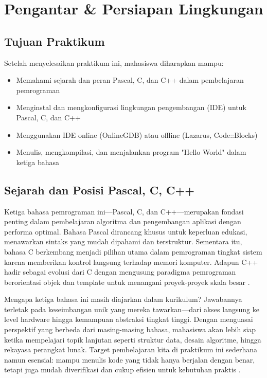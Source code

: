\documentclass[../main.tex]{subfiles}
\begin{document}
\chapter{Pengantar \& Persiapan Lingkungan}

\section*{Tujuan Praktikum}
Setelah menyelesaikan praktikum ini, mahasiswa diharapkan mampu:
\begin{itemize}
  \item Memahami sejarah dan peran Pascal, C, dan C++ dalam pembelajaran pemrograman
  \item Menginstal dan mengkonfigurasi lingkungan pengembangan (IDE) untuk Pascal, C, dan C++
  \item Menggunakan IDE online (OnlineGDB) atau offline (Lazarus, Code::Blocks)
  \item Menulis, mengkompilasi, dan menjalankan program "Hello World" dalam ketiga bahasa
\end{itemize}

\section{Sejarah dan Posisi Pascal, C, C++}
Ketiga bahasa pemrograman ini—Pascal, C, dan C++—merupakan fondasi penting dalam pembelajaran algoritma dan pengembangan aplikasi dengan performa optimal. Bahasa Pascal dirancang khusus untuk keperluan edukasi, menawarkan sintaks yang mudah dipahami dan terstruktur. Sementara itu, bahasa C berkembang menjadi pilihan utama dalam pemrograman tingkat sistem karena memberikan kontrol langsung terhadap memori komputer. Adapun C++ hadir sebagai evolusi dari C dengan mengusung paradigma pemrograman berorientasi objek dan template untuk menangani proyek-proyek skala besar \parencite{pascal-tutorial-wikibooks,gnu-c-manual,cpp-reference}.

Mengapa ketiga bahasa ini masih diajarkan dalam kurikulum? Jawabannya terletak pada keseimbangan unik yang mereka tawarkan—dari akses langsung ke level hardware hingga kemampuan abstraksi tingkat tinggi. Dengan menguasai perspektif yang berbeda dari masing-masing bahasa, mahasiswa akan lebih siap ketika mempelajari topik lanjutan seperti struktur data, desain algoritme, hingga rekayasa perangkat lunak. Target pembelajaran kita di praktikum ini sederhana namun esensial: mampu menulis kode yang tidak hanya berjalan dengan benar, tetapi juga mudah diverifikasi dan cukup efisien untuk kebutuhan praktis \parencite{free-pascal-docs,gnu-c-manual,cpp-reference}.
\end{document}
